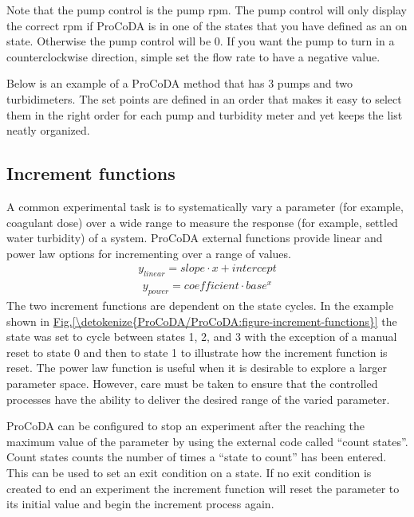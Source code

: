 \documentclass[letterpaper,10pt,english]{sphinxmanual}
\begin{document}
Note that the pump control is the pump rpm. The pump control will only display the correct rpm if ProCoDA is in one of the states that you have defined as an on state. Otherwise the pump control will be 0. If you want the pump to turn in a counterclockwise direction, simple set the flow rate to have a negative value.

Below is an example of a ProCoDA method that has 3 pumps and two turbidimeters. The set points are defined in an order that makes it easy to select them in the right order for each pump and turbidity meter and yet keeps the list neatly organized.


\subsection{Increment functions}
\label{\detokenize{ProCoDA/ProCoDA:increment-functions}}
A common experimental task is to systematically vary a parameter (for example, coagulant dose) over a wide range to measure the response (for example, settled water turbidity) of a system. ProCoDA external functions provide linear and power law options for incrementing over a range of values.
\begin{equation}\label{equation:ProCoDA/ProCoDA:ProCoDA/ProCoDA:3}
\begin{split}y_{linear} = slope \cdot x + intercept\end{split}
\end{equation}\begin{equation}\label{equation:ProCoDA/ProCoDA:ProCoDA/ProCoDA:4}
\begin{split}y_{power} = coefficient \cdot base^x\end{split}
\end{equation}
The two increment functions are dependent on the state cycles. In the example shown in \hyperref[\detokenize{ProCoDA/ProCoDA:figure-increment-functions}]{Fig.\@ \ref{\detokenize{ProCoDA/ProCoDA:figure-increment-functions}}} the state was set to cycle between states 1, 2, and 3 with the exception of a manual reset to state 0 and then to state 1 to illustrate how the increment function is reset. The power law function is useful when it is desirable to explore a larger parameter space. However, care must be taken to ensure that the controlled processes have the ability to deliver the desired range of the varied parameter.

ProCoDA can be configured to stop an experiment after the reaching the maximum value of the parameter by using the external code called “count states”. Count states counts the number of times a “state to count” has been entered. This can be used to set an exit condition on a state. If no exit condition is created to end an experiment the increment function will reset the parameter to its initial value and begin the increment process again.
\end{document}
